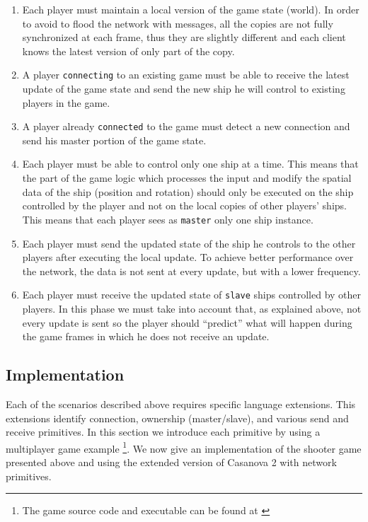 \begin{enumerate}
	\item Each player must maintain a local version of the game state (world). In order to avoid to flood the network with messages, all the copies are not fully synchronized at each frame, thus they are slightly different and each client knows the latest version of only part of the copy.
	\item A player \texttt{connecting} to an existing game must be able to receive the latest update of the game state and send the new ship he will control to existing players in the game.
	\item A player already \texttt{connected} to the game must detect a new connection and send his master portion of the game state.
	\item Each player must be able to control only one ship at a time. This means that the part of the game logic which processes the input and modify the spatial data of the ship (position and rotation) should only be executed on the ship controlled by the player and not on the local copies of other players' ships. This means that each player sees as \texttt{master} only one ship instance.
	\item Each player must send the updated state of the ship he controls to the other players after executing the local update. To achieve better performance over the network, the data is not sent at every update, but with a lower frequency.
	\item Each player must receive the updated state of \texttt{slave} ships controlled by other players. In this phase we must take into account that, as explained above, not every update is sent so the player should ``predict'' what will happen during the game frames in which he does not receive an update.
\end{enumerate}

\subsection*{Implementation}
Each of the scenarios described above requires specific language extensions. This extensions identify connection, ownership (master/slave), and various send and receive primitives. In this section we introduce each primitive by using a multiplayer game example \footnote{The game source code and executable can be found at \cite{MULTIPLAYER_SHOOTER}}. We now give an implementation of the shooter game presented above and using the extended version of Casanova 2 with network primitives. 

